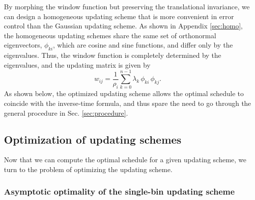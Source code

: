 \documentclass[reprint, superscriptaddress, floatfix]{revtex4-1}
\begin{document}
By morphing the window function
but preserving the translational invariance,
we can design a homogeneous updating scheme
that is more convenient in error control
than the Gaussian updating scheme.
%
%
As shown in Appendix \ref{sec:homo},
the homogeneous updating schemes share
the same set of orthonormal eigenvectors, $\phi_{ki}$,
which are cosine and sine functions,
and differ only by the eigenvalues.
%
Thus, the window function is completely determined
by the eigenvalues, and the updating matrix
is given by\cite{bussi2006}
%
\begin{equation}
  w_{ij}
  =
  \frac{1}{\rho_i} \sum_{k=0}^{n - 1}
  \lambda_k \, \phi_{ki} \, \phi_{kj}
  .
  \label{eq:w_from_phi}
\end{equation}
%
As shown below,
the optimized updating scheme
allows the optimal schedule to coincide with
the inverse-time formula,
and thus spare the need to
go through the general procedure in Sec. \ref{sec:procedure}.




\subsection{\label{sec:cmpschemes}
Optimization of updating schemes}


Now that we can compute the optimal schedule
for a given updating scheme,
we turn to the problem of optimizing
the updating scheme.


\subsubsection{\label{sec:optWL}
Asymptotic optimality of the single-bin updating scheme}
\end{document}

